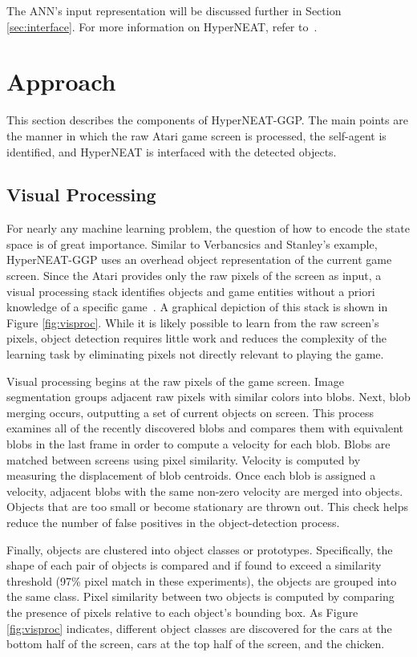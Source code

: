 \documentclass{sig-alternate}
\begin{document}
The ANN's input representation will be discussed further in Section \ref{sec:interface}. For more information on HyperNEAT, refer to~\cite{gauci08}.

\section{Approach}
\label{sec:approach}
This section describes the components of HyperNEAT-GGP. The main points are the manner in which the raw Atari game screen is processed, the self-agent is identified, and HyperNEAT is interfaced with the detected objects. 

\subsection{Visual Processing}
For nearly any machine learning problem, the question of how to encode the state space is of great importance. Similar to Verbancsics and Stanley's example, HyperNEAT-GGP uses an overhead object representation of the current game screen. Since the Atari provides only the raw pixels of the screen as input, a visual processing stack identifies objects and game entities without a priori knowledge of a specific game~\cite{naddaf10}. A graphical depiction of this stack is shown in Figure \ref{fig:visproc}. While it is likely possible to learn from the raw screen's pixels, object detection requires little work and reduces the complexity of the learning task by eliminating pixels not directly relevant to playing the game.

Visual processing begins at the raw pixels of the game screen. Image segmentation groups adjacent raw pixels with similar colors into blobs. Next, blob merging occurs, outputting a set of current objects on screen. This process examines all of the recently discovered blobs and compares them with equivalent blobs in the last frame in order to compute a velocity for each blob. Blobs are matched between screens using pixel similarity. Velocity is computed by measuring the displacement of blob centroids. Once each blob is assigned a velocity, adjacent blobs with the same non-zero velocity are merged into objects. Objects that are too small or become stationary are thrown out. This check helps reduce the number of false positives in the object-detection process.

Finally, objects are clustered into object classes or prototypes. Specifically, the shape of each pair of objects is compared and if found to exceed a similarity threshold (97\% pixel match in these experiments), the objects are grouped into the same class. Pixel similarity between two objects is computed by comparing the presence of pixels relative to each object's bounding box. As Figure \ref{fig:visproc} indicates, different object classes are discovered for the cars at the bottom half of the screen, cars at the top half of the screen, and the chicken. 
\end{document}
